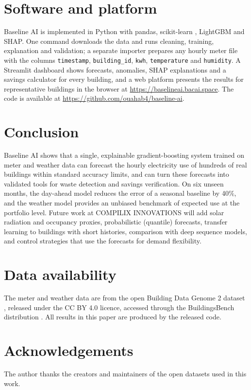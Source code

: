 \documentclass[11pt,a4paper]{article}
\begin{document}
\section{Software and platform}
Baseline AI is implemented in Python with pandas, scikit-learn \citep{pedregosa2011scikit}, LightGBM and SHAP. One
command downloads the data and runs cleaning, training, explanation and validation; a separate importer prepares
any hourly meter file with the columns \texttt{timestamp}, \texttt{building\_id}, \texttt{kwh},
\texttt{temperature} and \texttt{humidity}. A Streamlit dashboard shows forecasts, anomalies, SHAP explanations and a
savings calculator for every building, and a web platform presents the results for representative buildings in the
browser at \url{https://baselineai.bacai.space}. The code is available at
\url{https://github.com/ouahab4/baseline-ai}.

\section{Conclusion}\label{sec:conclusion}
Baseline AI shows that a single, explainable gradient-boosting system trained on meter and weather data can forecast the
hourly electricity use of hundreds of real buildings within standard accuracy limits, and can turn these forecasts
into validated tools for waste detection and savings verification. On six unseen months, the day-ahead model reduces
the error of a seasonal baseline by 40\%, and the weather model provides an unbiased benchmark of expected use at the
portfolio level. Future work at COMPILIX INNOVATIONS will add solar radiation and occupancy proxies, probabilistic
(quantile) forecasts, transfer learning to buildings with short histories, comparison with deep sequence models, and
control strategies that use the forecasts for demand flexibility.

\section*{Data availability}
The meter and weather data are from the open Building Data Genome 2 dataset \citep{miller2020bdg2}, released under
the CC BY 4.0 licence, accessed through the BuildingsBench distribution \citep{emami2023buildingsbench}. All
results in this paper are produced by the released code.

\section*{Acknowledgements}
The author thanks the creators and maintainers of the open datasets used in this work.
\end{document}
